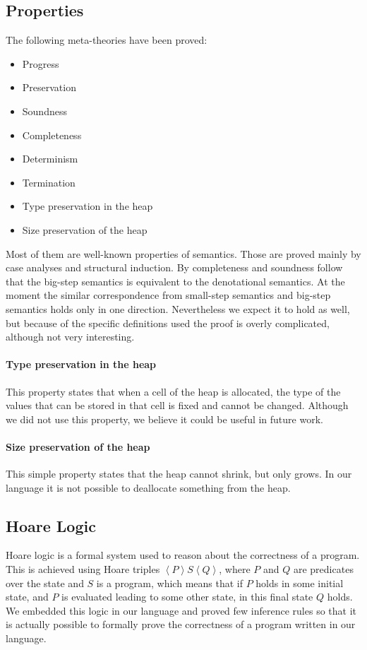 \documentclass[12pt, a4paper, oneside]{article}
\begin{document}
\subsection{Properties}
\label{sec:metatheories}
The following meta-theories have been proved:
\begin{itemize}
	\item Progress
	\item Preservation
	\item Soundness
	\item Completeness
	\item Determinism
	\item Termination
	\item Type preservation in the heap
	\item Size preservation of the heap
\end{itemize}

Most of them are well-known properties of semantics. Those are proved mainly by case analyses and structural induction. By completeness and soundness follow that the big-step semantics is equivalent to the denotational semantics. At the moment the similar correspondence from small-step semantics and big-step semantics holds only in one direction. Nevertheless we expect it to hold as well, but because of the specific definitions used the proof is overly complicated, although not very interesting.

\paragraph{Type preservation in the heap}
This property states that when a cell of the heap is allocated, the type of the values that can be stored in that cell is fixed and cannot be changed. Although we did not use this property, we believe it could be useful in future work.

\paragraph{Size preservation of the heap}
This simple property states that the heap cannot shrink, but only grows.
In our language it is not possible to deallocate something from the heap.

\subsection{Hoare Logic}
\label{sec:hoare}
Hoare logic is a formal system used to reason about the correctness of a program. 
This is achieved using Hoare triples $\left\langle P \right\rangle   S \left\langle Q \right\rangle$, where $P$ and $Q$ are predicates over the state and $S$ is a program, which means that if $P$ holds in some initial state, and $P$ is evaluated leading to some other state, in this final state $Q$ holds.
We embedded this logic in our language and proved few inference rules so that it is actually possible to formally prove the correctness of a program written in our language.
\end{document}
